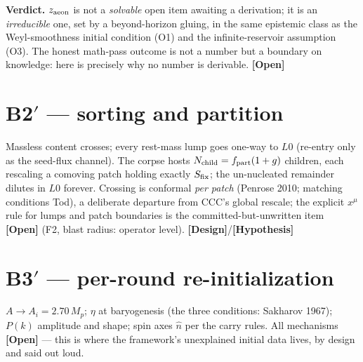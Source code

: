 \documentclass[11pt]{article}
\newcommand{\Open}{\textbf{\textcolor{gray!10!black}{[Open]}}}
\newcommand{\hyp}{\textcolor{orange!80!black}{\textbf{[Hypothesis]}}}
\newcommand{\design}{\textcolor{blue!60!black}{\textbf{[Design]}}}
\newcommand{\open}{\textcolor{red!70!black}{\textbf{[Open]}}}
\begin{document}
\textbf{Verdict.} $z_{\rm aeon}$ is not a \emph{solvable} open item awaiting a derivation; it is an \emph{irreducible} one, set by a beyond-horizon gluing, in the same epistemic class as the Weyl-smoothness initial condition (O1) and the infinite-reservoir assumption (O3). The honest math-pass outcome is not a number but a boundary on knowledge: here is precisely why no number is derivable. \Open


\section{B2$'$ --- sorting and partition}
Massless content crosses; every rest-mass lump goes one-way to $L0$ (re-entry only as the seed-flux channel). The corpse hosts $N_{\rm child}=f_{\rm part}(1+g)$ children, each rescaling a comoving patch holding exactly $S_{\rm fix}$; the un-nucleated remainder dilutes in $L0$ forever. Crossing is conformal \emph{per patch} (Penrose 2010; matching conditions Tod), a deliberate departure from CCC's global rescale; the explicit $x^\mu$ rule for lumps and patch boundaries is the committed-but-unwritten item \open{} (F2, blast radius: operator level). \design/\hyp

\section{B3$'$ --- per-round re-initialization}
$A\to A_i=2.70\,M_p$; $\eta$ at baryogenesis (the three conditions: Sakharov 1967); $P(k)$ amplitude and shape; spin axes $\hat n$ per the carry rules. All mechanisms \open{} --- this is where the framework's unexplained initial data lives, by design and said out loud.

\end{document}
